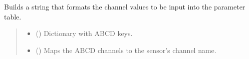 \documentclass[letterpaper,10pt,english]{sphinxmanual}
\begin{document}
\begin{fulllineitems}
\begin{fulllineitems}
\begin{quote}
\begin{description}
\end{description}\end{quote}

\end{fulllineitems}


\begin{fulllineitems}
\label{\detokenize{Setup.SetupOneDevice:Setup.SetupOneDevice.Setup_8401HR.Setup8401HR._NiceABCDtableText}}
\pysigstartsignatures
{}
\pysigstopsignatures
\sphinxAtStartPar
Builds a string that formats the channel values to be input into the parameter table.
\begin{quote}\begin{description}
\begin{itemize}
\item {} 
\sphinxAtStartPar
{} (\sphinxstyleliteralemphasis{\sphinxupquote{{[}}}\sphinxstyleliteralemphasis{\sphinxupquote{,}}\sphinxstyleliteralemphasis{\sphinxupquote{ | }}\sphinxstyleliteralemphasis{\sphinxupquote{ | }}\sphinxstyleliteralemphasis{\sphinxupquote{{]}}}) \textendash{} Dictionary with ABCD keys.

\item {} 
\sphinxAtStartPar
{} (\sphinxstyleliteralemphasis{\sphinxupquote{{[}}}\sphinxstyleliteralemphasis{\sphinxupquote{,}}\sphinxstyleliteralemphasis{\sphinxupquote{{]}}}) \textendash{} Maps the ABCD channels to the sensor’s channel name.


\end{itemize}
\end{description}
\end{quote}
\end{fulllineitems}
\end{fulllineitems}
\end{document}
